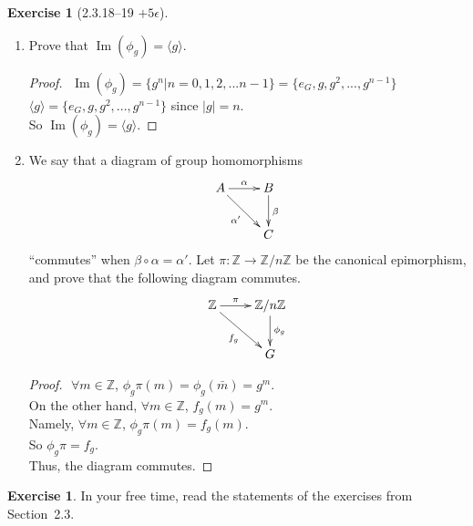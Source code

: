 \documentclass{amsart}
\newcommand{\bbz}{\mathbb{Z}}
\newcommand{\im}{\operatorname{Im}}
\theoremstyle{plain}
\theoremstyle{definition}
\newtheorem{exer}[lem]{Exercise}
\begin{document}
\begin{exer}[2.3.18--19 $+5\epsilon$]
\begin{enumerate}[(a)]
\begin{enumerate}[(1)]
\item Prove that $\im(\phi_g)=\langle g\rangle$.
	\begin{proof}
		$ $\newline
		$\im(\phi_g) = \{g^n| n = 0,1,2,...n - 1\} = \{e_G, g,g^2,...,g^{n-1}\} $\\
		$\langle g \rangle =\{e_G, g,g^2,...,g^{n-1}\}$ since $|g| = n$.\\
		So $\im(\phi_g) = \langle g \rangle$.
	\end{proof}
\item We say that a diagram 
of group homomorphisms
$$\xymatrix{A\ar[r]^-\alpha\ar[rd]_{\alpha'}&B\ar[d]^\beta \\ & C}$$
``commutes'' when $\beta\circ\alpha=\alpha'$.
Let $\pi\colon \bbz\to\bbz/n\bbz$ be the canonical epimorphism, and prove that the following diagram commutes.
$$\xymatrix{\bbz\ar[r]^-{\pi}\ar[rd]_{f_g}&\bbz/n\bbz\ar[d]^{\phi_g} \\ & G}$$

\begin{proof}
	$ $\newline
	$\forall m \in \bbz$, $\phi_g\pi(m) = \phi_g(\bar{m}) = g^m$.\\
	On the other hand, $\forall m \in \bbz$, $f_g(m) = g^m$.\\
	Namely, $\forall m \in \bbz$, $\phi_g\pi(m) = f_g(m)$.\\
	So $\phi_g\pi = f_g$. \\
	Thus, the diagram commutes.
\end{proof}

\end{enumerate}
	
\end{enumerate}

\end{exer}


\begin{exer}
In your free time, read the statements of the  exercises from Section~2.3.
\end{exer}
\end{document}
